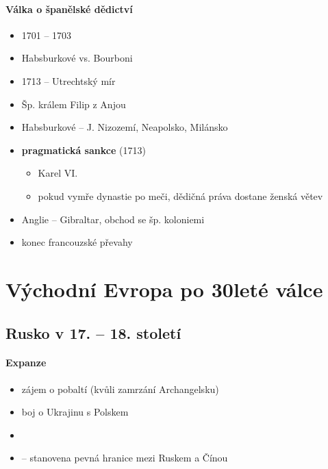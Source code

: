 \paragraph{Válka o španělské dědictví}
\begin{itemize}
\item 1701 -- 1703
\item Habsburkové vs. Bourboni
\item 1713 -- Utrechtský mír
\item Šp. králem Filip z Anjou
\item Habsburkové -- J. Nizozemí, Neapolsko, Milánsko
\item \textbf{pragmatická sankce} (1713)
	\begin{itemize}
	\item Karel VI.
	\item pokud vymře dynastie po meči, dědičná práva dostane ženská větev
	\end{itemize}
\item Anglie -- Gibraltar, obchod se šp. koloniemi
\item konec francouzské převahy
\end{itemize}



\section{Východní Evropa po 30leté válce}
\subsection{Rusko v 17. -- 18. století}
\paragraph{Expanze}
\begin{itemize}
\item zájem o pobaltí (kvůli zamrzání Archangelsku)
\item boj o Ukrajinu s Polskem 
\item {}
\item {} -- stanovena pevná hranice mezi Ruskem a Čínou
\end{itemize}

